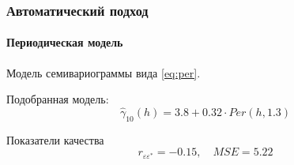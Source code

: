 \documentclass{beamer}
\begin{document}
\begin{frame}
  \frametitle{Автоматический подход}
  \framesubtitle{Периодическая модель}
  \begin{multicols}{2}
    \begin{small}
      Модель семивариограммы вида \eqref{eq:per}.
      
      \medskip
      
      Подобранная модель:
      \begin{equation}
        \label{eq:gamma10}
        \widehat{\gamma}_{10}(h) = 3.8 + 0.32 \cdot Per(h, 1.3)
      \end{equation}
      
      Показатели качества
      \begin{equation*}
        r_{\varepsilon\varepsilon^{*}} = -0.15, \quad MSE = 5.22
      \end{equation*}
    \end{small}
    

\end{multicols}
\end{frame}
\end{document}
